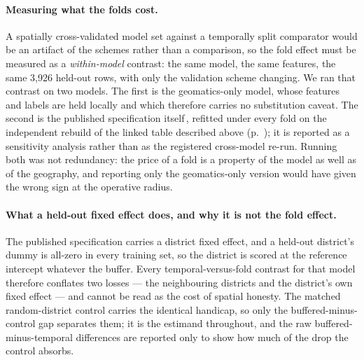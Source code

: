 \paragraph{Measuring what the folds cost.} A spatially cross-validated model set against a temporally split comparator would be an artifact of the schemes rather than a comparison, so the fold effect must be measured as a \emph{within-model} contrast: the same model, the same features, the same 3{,}926 held-out rows, with only the validation scheme changing. We ran that contrast on two models. The first is the geomatics-only model, whose features and labels are held locally and which therefore carries no substitution caveat. The second is the published specification itself\,\REBUILD, refitted under every fold on the independent rebuild of the linked table described above (p.~\pageref{par:rebuild}); it is reported as a sensitivity analysis rather than as the registered cross-model re-run. Running both was not redundancy: the price of a fold is a property of the model as well as of the geography, and reporting only the geomatics-only version would have given the wrong sign at the operative radius.

\paragraph{What a held-out fixed effect does, and why it is not the fold effect.} The published specification carries a district fixed effect, and a held-out district's dummy is all-zero in every training set, so the district is scored at the reference intercept whatever the buffer. Every temporal-versus-fold contrast for that model therefore conflates two losses --- the neighbouring districts and the district's own fixed effect --- and cannot be read as the cost of spatial honesty. The matched random-district control carries the identical handicap, so only the buffered-minus-control gap separates them; it is the estimand throughout, and the raw buffered-minus-temporal differences are reported only to show how much of the drop the control absorbs.

